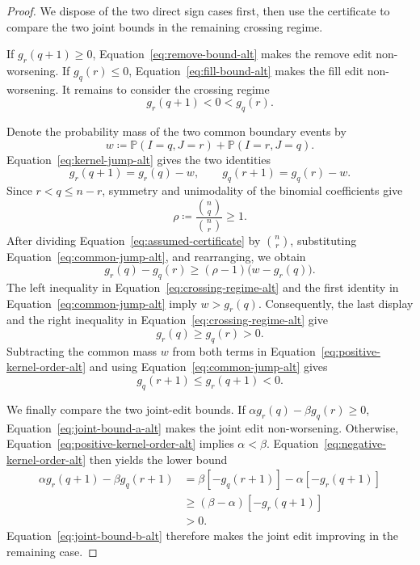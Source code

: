 \documentclass[11pt]{article}
\newcommand{\Prob}{\ensuremath{\mathbb P}\xspace}
\begin{document}
\begin{proof}
We dispose of the two direct sign cases first, then use the certificate to compare the two joint bounds in the remaining crossing regime.

If ${g_r(q+1)\geq0}$, Equation~\eqref{eq:remove-bound-alt} makes the remove edit non-worsening.
If ${g_q(r)\leq0}$, Equation~\eqref{eq:fill-bound-alt} makes the fill edit non-worsening.
It remains to consider the crossing regime
\begin{equation}
g_r(q+1)<0<g_q(r).
\label{eq:crossing-regime-alt}
\end{equation}

Denote the probability mass of the two common boundary events by
\begin{equation*}
w\coloneqq\Prob(I=q,J=r)+\Prob(I=r,J=q).
\end{equation*}
Equation~\eqref{eq:kernel-jump-alt} gives the two identities
\begin{equation}
g_r(q+1)=g_r(q)-w,
\qquad
g_q(r+1)=g_q(r)-w.
\label{eq:common-jump-alt}
\end{equation}
Since ${r<q\leq n-r}$, symmetry and unimodality of the binomial coefficients give
\begin{equation*}
\rho\coloneqq\frac{\binom nq}{\binom nr}\geq1.
\end{equation*}
After dividing Equation~\eqref{eq:assumed-certificate} by $\binom nr$, substituting Equation~\eqref{eq:common-jump-alt}, and rearranging, we obtain
\begin{equation*}
g_r(q)-g_q(r)
\geq
(\rho-1)\bigl(w-g_r(q)\bigr).
\end{equation*}
The left inequality in Equation~\eqref{eq:crossing-regime-alt} and the first identity in Equation~\eqref{eq:common-jump-alt} imply ${w>g_r(q)}$.
Consequently, the last display and the right inequality in Equation~\eqref{eq:crossing-regime-alt} give
\begin{equation}
g_r(q)\geq g_q(r)>0.
\label{eq:positive-kernel-order-alt}
\end{equation}
Subtracting the common mass $w$ from both terms in Equation~\eqref{eq:positive-kernel-order-alt} and using Equation~\eqref{eq:common-jump-alt} gives
\begin{equation}
g_q(r+1)\leq g_r(q+1)<0.
\label{eq:negative-kernel-order-alt}
\end{equation}

We finally compare the two joint-edit bounds.
If ${\alpha g_r(q)-\beta g_q(r)\geq0}$, Equation~\eqref{eq:joint-bound-a-alt} makes the joint edit non-worsening.
Otherwise, Equation~\eqref{eq:positive-kernel-order-alt} implies ${\alpha<\beta}$.
Equation~\eqref{eq:negative-kernel-order-alt} then yields the lower bound
\begin{align*}
\alpha g_r(q+1)-\beta g_q(r+1)
&=\beta[-g_q(r+1)]-\alpha[-g_r(q+1)]\\
&\geq(\beta-\alpha)[-g_r(q+1)]\\
&>0.
\end{align*}
Equation~\eqref{eq:joint-bound-b-alt} therefore makes the joint edit improving in the remaining case.


\end{proof}
\end{document}
